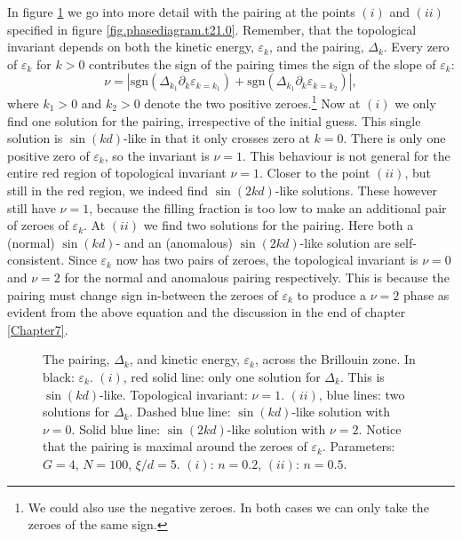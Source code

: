 In figure \ref{fig.Deltaexamples.t21.0} we go into more detail with the pairing at the points $(i)$ and $(ii)$ specified in figure \ref{fig.phasediagram.t21.0}. Remember, that the topological invariant depends on both the kinetic energy, $\varepsilon_k$, and the pairing, $\Delta_k$. Every zero of $\varepsilon_k$ for $k > 0$ contributes the sign of the pairing times the sign of the slope of $\varepsilon_k$:
\begin{equation}
\nu = \left| \text{sgn}\left(\Delta_{k_1}\partial_k\varepsilon_{k = k_1}\right) + \text{sgn}\left(\Delta_{k_1}\partial_k\varepsilon_{k = k_2}\right)\right|, \nonumber
\end{equation}
where $k_1 > 0$ and $k_2 > 0$ denote the two positive zeroes.\footnote{We could also use the negative zeroes. In both cases we can only take the zeroes of the same sign.} Now at $(i)$ we only find one solution for the pairing, irrespective of the initial guess. This single solution is $\sin(kd)$-like in that it only crosses zero at $k = 0$. There is only one positive zero of $\varepsilon_k$, so the invariant is $\nu = 1$. This behaviour is not general for the entire red region of topological invariant $\nu = 1$. Closer to the point $(ii)$, but still in the red region, we indeed find $\sin(2kd)$-like solutions. These however still have $\nu = 1$, because the filling fraction is too low to make an additional pair of zeroes of $\varepsilon_k$. At $(ii)$ we find two solutions for the pairing. Here both a (normal) $\sin(kd)$- and an (anomalous) $\sin(2kd)$-like solution are self-consistent. Since $\varepsilon_k$ now has two pairs of zeroes, the topological invariant is $\nu = 0$ and $\nu = 2$ for the normal and anomalous pairing respectively. This is because the pairing must change sign in-between the zeroes of $\varepsilon_k$ to produce a $\nu = 2$ phase as evident from the above equation and the discussion in the end of chapter \ref{Chapter7}. 

\begin{figure}
\begin{center}

\caption{The pairing, $\Delta_k$, and kinetic energy, $\varepsilon_k$, across the Brillouin zone. In black: $\varepsilon_k$. $(i)$, red solid line: only one solution for $\Delta_k$. This is $\sin(kd)$-like. Topological invariant: $\nu = 1$. $(ii)$, blue lines: two solutions for $\Delta_k$. Dashed blue line: $\sin(kd)$-like solution with $\nu = 0$. Solid blue line: $\sin(2kd)$-like solution with $\nu = 2$. Notice that the pairing is maximal around the zeroes of $\varepsilon_k$. Parameters: $G = 4$, $N = 100$, $\xi / d = 5$. $(i)$: $n = 0.2$, $(ii)$: $n = 0.5$.}
\label{fig.Deltaexamples.t21.0}
\end{center}
\end{figure}

